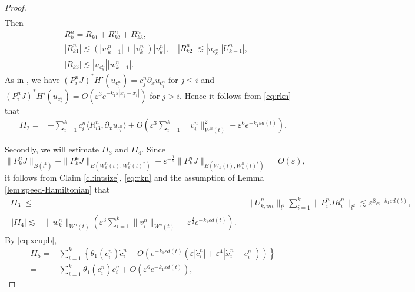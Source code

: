 \documentclass[11pt]{amsart}
\theoremstyle{remark}
\numberwithin{equation}{section}
\begin{document}
\begin{proof}
\begin{align*}
\end{align*}
Then
\begin{equation}
\label{eq:rkn}
  \begin{split}
&  R_k^n=R_{k1}+R_{k2}^n+R_{k3}^n,\\
& |R_{k1}^n|\lesssim (|w_{k-1}^n|+|v_k^n|)|v_k^n|,\quad
|R_{k2}^n|\lesssim |u_{c_k^n}||U_{k-1}^n|,\\
& |R_{k3}|\lesssim  |u_{c_k^n}||w_{k-1}^n|.
  \end{split}
\end{equation}
As in \cite[Lemma 3.1]{Mi2}, we have
$(P_i^nJ)^*H'(u_{c_j^n})=c_j^n{\partial}_xu_{c_j^n}$ for $j\le i$ and
$(P_i^nJ)^*H'(u_{c_j^n})=O({\varepsilon}^3e^{-k_1{\varepsilon}|x_j-x_i|})$ for $j>i$.
Hence it follows from \eqref{eq:rkn} that
\begin{equation}
  \label{eq:ham23}
  \begin{split}
II_2=& -\sum_{i=1}^k c_i^n{\langle} R_{i3}^n,{\partial}_xu_{c_i^n}{\rangle}
+O\left({\varepsilon}^3\sum_{i=1}^k\|v_i^n\|_{W^n(t)}^2+{\varepsilon}^6e^{-k_1{\varepsilon} d(t)}\right).
  \end{split}
\end{equation}
\par
Secondly, we will estimate $II_3$ and $II_4$.
Since
\begin{equation}
  \label{eq:pkupb}
\|P_k^nJ\|_{B(l^1)}+\|P_k^nJ\|_{B(W_k^n(t),W_k^n(t)^*)}+
{\varepsilon}^{-\frac12}\|P_k^nJ\|_{B(\widetilde{W}_k(t),W_k^n(t)^*)}=O({\varepsilon}),
\end{equation}
it follows from Claim \ref{cl:intsize}, \eqref{eq:rkn} and the assumption of
Lemma \ref{lem:speed-Hamiltonian} that
\begin{align}
  \label{eq:ham24}
|II_3|\le & \|U_{k,int}^n\|_{l^2}\sum_{i=1}^k\|P_i^nJR_i^n\|_{l^2}
\lesssim  {\varepsilon}^8e^{-k_1{\varepsilon} d(t)},
\\ \label{eq:ham25}  
\begin{split}
|II_4|  \lesssim & \|w_k^n\|_{W^n(t)}
\left({\varepsilon}^3\sum_{i=1}^k\|v_i^n\|_{W^n(t)}+{\varepsilon}^{\frac92}e^{-k_1{\varepsilon} d(t)}\right).
\end{split}
\end{align}
By \eqref{eq:xcupb},
\begin{equation}
  \label{eq:ham26}
  \begin{split}
II_5=& \sum_{i=1}^k\left\{\theta_1(c_i^n)\dot{c}_i^n
+O(e^{-k_1{\varepsilon} d(t)}({\varepsilon}|\dot{c}_i^n|+{\varepsilon}^4|\dot{x}_i^n-c_i^n|))\right\}
\\ =& \sum_{i=1}^k\theta_1(c_i^n)\dot{c}_i^n+O\left({\varepsilon}^6e^{-k_1{\varepsilon} d(t)}\right),

\end{split}
\end{equation}
\end{proof}
\end{document}
